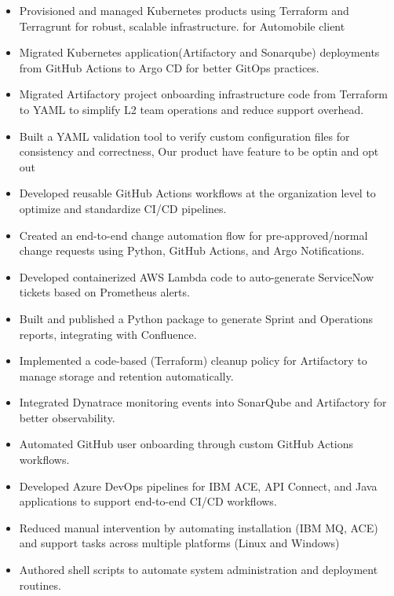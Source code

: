 \documentclass[10pt,a4paper,ragged2e,withhyper]{altacv}
\begin{document}
\begin{paracol}{2}

\begin{itemize}
\item Provisioned and managed Kubernetes products using Terraform and Terragrunt for robust, scalable infrastructure. for Automobile client
\item Migrated Kubernetes application(Artifactory and Sonarqube) deployments from GitHub Actions to Argo CD for better GitOps practices.
\item Migrated Artifactory project onboarding infrastructure code from Terraform to YAML to simplify L2 team operations and reduce support overhead.
\item Built a YAML validation tool to verify custom configuration files for consistency and correctness, Our product have feature to be optin and opt out
\item Developed reusable GitHub Actions workflows at the organization level to optimize and standardize CI/CD pipelines.
\item Created an end-to-end change automation flow for pre-approved/normal change requests using Python, GitHub Actions, and Argo Notifications.
\item Developed containerized AWS Lambda code to auto-generate ServiceNow tickets based on Prometheus alerts.
\item Built and published a Python package to generate Sprint and Operations reports, integrating with Confluence.
\item Implemented a code-based (Terraform) cleanup policy for Artifactory to manage storage and retention automatically.
\item Integrated Dynatrace monitoring events into SonarQube and Artifactory for better observability.
\item Automated GitHub user onboarding through custom GitHub Actions workflows.
\item Developed Azure DevOps pipelines for IBM ACE, API Connect, and Java applications to support end-to-end CI/CD workflows.
\item Reduced manual intervention by automating installation (IBM MQ, ACE) and support tasks across multiple platforms (Linux and Windows)
\item Authored shell scripts to automate system administration and deployment routines.
\end{itemize}
\divider


\end{paracol}
\end{document}
